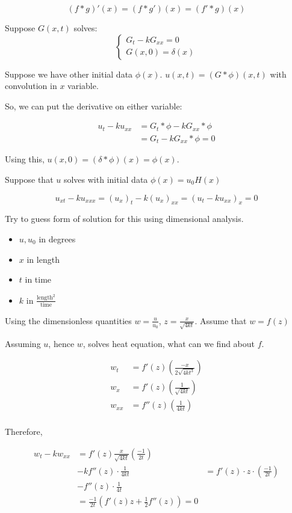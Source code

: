 \documentclass[main.tex]{subfiles}
\begin{document}
$$(f * g)'(x) = (f * g')(x) = (f' * g)(x)$$

Suppose $G(x, t)$ solves:
$$
\begin{cases}
    G_t - kG_{xx} = 0\\
    G(x, 0) = \delta(x)
\end{cases}
$$

Suppose we have other initial data $\phi(x)$. $u(x, t) = (G * \phi)(x, t)$ with convolution in $x$ variable.

So, we can put the derivative on either variable:

\begin{align}
u_t - ku_{xx} &= G_t * \phi - kG_{xx} * \phi \\
              &= G_t - kG_{xx} * \phi = 0
\end{align}

Using this, $u(x, 0) = (\delta * \phi)(x) = \phi(x)$.

Suppose that $u$ solves with initial data $\phi(x) = u_0 H(x)$

$$u_{xt} - ku_{xxx} = {(u_x)}_t - k{(u_x)}_{xx} = {(u_t - ku_{xx})}_x = 0$$

Try to guess form of solution for this using dimensional analysis.

\begin{itemize}
    \item $u, u_0$ in degrees
    \item $x$ in length
    \item $t$ in time
    \item $k$ in $\frac{\textrm{length}^2}{\textrm{time}}$
\end{itemize}

Using the dimensionless quantities $w = \frac{u}{u_0}$, $z = \frac{x}{\sqrt{4kt}}$. Assume that $w = f(z)$

Assuming $u$, hence $w$, solves heat equation, what can we find about $f$.

\begin{align}
w_t &= f'(z)\left(\frac{-x}{2\sqrt{4kt^3}}\right) \\
w_x &= f'(z)\left(\frac{1}{\sqrt{4kt}}\right) \\
w_{xx} &= f''(z)\left(\frac{1}{4kt}\right) \\
\end{align}

Therefore,

\begin{align}
w_t - kw_{xx} &= f'(z)\frac{x}{\sqrt{4kt}}\left(\frac{-1}{2t}\right) \\
              &- kf''(z)\cdot \frac{1}{4kt}
              &= f'(z)\cdot z \cdot \left(\frac{-1}{2t}\right) \\
              &- f''(z)\cdot \frac{1}{4t} \\
              &= \frac{-1}{2t}\left(f'(z)z + \frac{1}{2}f''(z)\right) = 0
\end{align}
\end{document}
